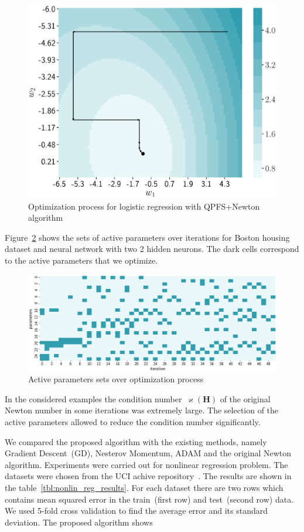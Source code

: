\documentclass[a4paper,12pt]{article}
\renewcommand{\kappa}{\ensuremath{\varkappa}}
\theoremstyle{plain} %
\theoremstyle{definition} %
\theoremstyle{remark} %
\newcommand{\bH}{\mathbf{H}}
\begin{document}
	\begin{figure}
		\centering
		\includegraphics[width=0.6\linewidth]{figs/irls_qpfs_2d.eps}	 
		\caption{Optimization process for logistic regression with QPFS+Newton algorithm}
		\label{fig:irls_qpfs_2d}
	\end{figure}

	Figure~\ref{fig:active_params_wrt_iters} shows the sets of active parameters over iterations for Boston housing dataset and neural network with two 2 hidden neurons. The dark cells correspond to the active parameters that we optimize.

	\begin{figure}[!h]	
		\centering
		\includegraphics[width=\linewidth]{figs/active_params_wrt_iters.eps}	 
		\caption{Active parameters sets over optimization process}
		\label{fig:active_params_wrt_iters}
	\end{figure}
	
	In the considered examples the condition number~$\kappa (\bH)$ of the original Newton number in some iterations was extremely large. 
	The selection of the active parameters allowed to reduce the condition number significantly. 
	
	We compared the proposed algorithm with the existing methods, namely Gradient Descent~(GD), Nesterov Momentum, ADAM and the original Newton algorithm. Experiments were carried out for nonlinear regression problem. The datasets were chosen from the UCI achive repository~\cite{uci2017}. The results are shown in the table~\ref{tbl:nonlin_reg_results}. For each dataset there are two rows which contains mean squared error in the train~(first row) and test~(second row) data. We used 5-fold cross validation to find the average error and its standard deviation. The proposed algorithm shows 
\end{document}
